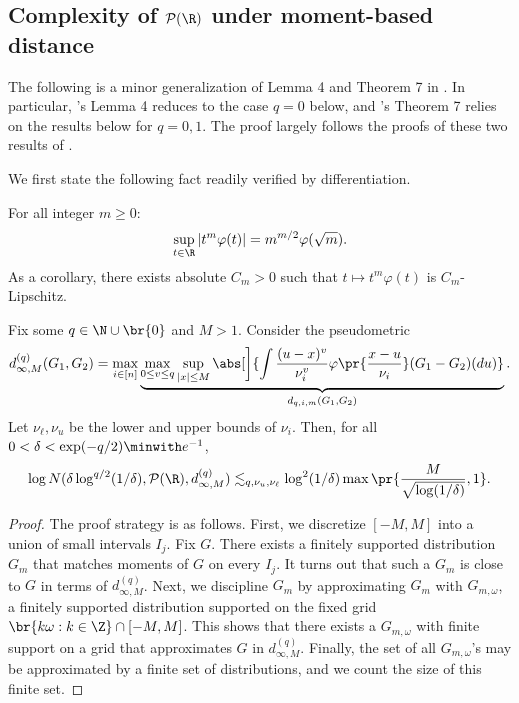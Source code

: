 \documentclass[12pt, reqno]{amsart}
\numberwithin{equation}{section}
\begin{document}
\begin{refsection}
\begin{appendices}
\subsection{Complexity of $\mathcal P(\R)$ under moment-based distance}
The following is a minor generalization of Lemma 4 and Theorem 7 in
\citet{jiang2020general}. In particular, \citet{jiang2020general}'s Lemma 4
reduces to the case $q=0$ below, and \citet{jiang2020general}'s Theorem 7
relies on the results below for $q=0,1$. The proof largely
follows the proofs of these two results of \citet{jiang2020general}.

We first state the following fact readily verified by differentiation.
\begin{lemma}
\label{lemma:lipschitz_smooth_varphi}
For all integer $m \ge 0$:
    \[
    \sup_{t\in \R} |t^m \varphi(t)| = m^{m/2} \varphi(\sqrt{m}).
    \]
As a corollary, there exists absolute $C_m > 0$ such that $t \mapsto t^m
\varphi(t)$ is $C_m$-Lipschitz.
\end{lemma}


\begin{prop}
\label{prop:covering_for_moments}
Fix some $q \in \N \cup \br{0}$ and $M > 1$.
Consider the pseudometric \[d_{\infty, M}^{(q)}(G_1, G_2) = \max_{i\in[n]}
\underbrace{\max_{0 \le v
\le q}\sup_{|x|
\le M} \abs[\bigg]
{\int
 \frac{(u-x)^v}{\nu_i^v} \varphi\pr{\frac{x-u}{\nu_i}}  (G_1 - G_2)(du)
}
}_{d_{q,i,m}(G_1, G_2)}.\]
Let $\nu_\ell, \nu_u$ be the lower and upper bounds of $\nu_i$.
Then, for all $0 < \delta < \exp(-q/2) \minwith e^{-1}$,
\[
\log N(\delta \log^{q/2}(1/\delta), \mathcal P(\R), d_{\infty, M}^{(q)}) \lesssim_{q, \nu_u,
\nu_\ell}\log^2(1/\delta) \max\pr{\frac{M}{\sqrt{\log
(1/\delta)}}, 1}.
\]
\end{prop}


\begin{proof}
The proof strategy is as follows. 
First, we discretize $[-M, M]$ into a
union of small intervals $I_j$. Fix $G$. There exists a finitely supported distribution
$G_m$ that matches moments of $G$ on every $I_j$. It turns out that such a $G_m$ is close
to $G$ in terms of $d^{(q)}_{\infty, M}$. Next, we discipline $G_m$ by
approximating $G_m$ with $G_{m,\omega}$, a finitely supported distribution supported on the
fixed grid $\br{k\omega : k \in \Z} \cap [-M,M]$. 
This shows that there exists a $G_{m,\omega}$ with finite support on a grid that
approximates $G$ in $d_{\infty, M}^{(q)}$.
Finally, the set of all $G_{m,\omega}$'s may
be approximated by a finite set of distributions, and we count the size of this finite
set.


\end{proof}
\end{appendices}
\end{refsection}
\end{document}
